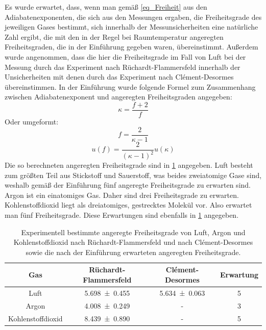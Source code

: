 \documentclass[
	a4paper,
	12pt,
	pagesize,
	ngerman
]{scrartcl}
\begin{document}
	Es wurde erwartet, dass, wenn man gemäß \cref{eq_Freiheit} aus den Adiabatenexponenten, die sich aus den Messungen ergaben, die Freiheitsgrade des jeweiligen Gases bestimmt, sich innerhalb der Messunsicherheiten eine natürliche Zahl ergibt, die mit den in der Regel bei Raumtemperatur angeregten Freiheitsgraden, die in der Einführung gegeben waren, übereinstimmt. %
	Außerdem wurde angenommen, dass die hier die Freiheitsgrade im Fall von Luft bei der Messung durch das Experiment nach Rüchardt-Flammersfeld innerhalb der Unsicherheiten mit denen durch das Experiment nach Clément-Desormes übereinstimmen.
	In der Einführung wurde folgende Formel zum Zusammenhang zwischen Adiabatenexponent und angeregten Freiheitsgraden angegeben:
	\begin{equation}
		\kappa = \frac{f+2}{f}
	\end{equation}
	Oder umgeformt:
	\begin{equation}
		f = \frac{2}{\kappa -1}
		\label{eq_Freiheit}
	\end{equation}
	\begin{equation}
	u(f) = \frac{2}{(\kappa -1)^2} u(\kappa) 
	\end{equation}
	Die so berechneten angeregten Freiheitsgrade sind in \cref{tab_Freiheit} angegeben.
	Luft besteht zum größten Teil aus Stickstoff und Sauerstoff, was beides zweiatomige Gase sind, weshalb gemäß der Einführung fünf angeregte Freiheitsgrade zu erwarten sind.
	Argon ist ein einatomiges Gas. %
	Daher sind drei Freiheitsgrade zu erwarten.
	Kohlenstoffdioxid liegt als dreiatomiges, gestrecktes Molekül vor.
	Also erwartet man fünf Freiheitsgrade.
	Diese Erwartungen sind ebenfalls in \cref{tab_Freiheit} angegeben.
	\begin{table}[H]
		\centering
		\begin{tabular}{ c | c | c | c }
			Gas & Rüchardt-Flammersfeld  & Clément-Desormes & Erwartung \\ \hline
			Luft & \SI{5,698 \pm 0,455}{} & \SI{5,634 \pm 0,063}{} & 5\\
			Argon & \SI{4,008 \pm 0,249}{} & - & 3\\
			Kohlenstoffdioxid & \SI{8,439 \pm 0,890}{} & - & 5\\
		\end{tabular}
		\caption{Experimentell bestimmte angeregte Freiheitsgrade von Luft, Argon und Kohlenstoffdioxid nach Rüchardt-Flammersfeld und nach Clément-Desormes sowie die nach der Einführung erwarteten angeregten Freiheitsgrade.}
		\label{tab_Freiheit}
	\end{table}
\end{document}
